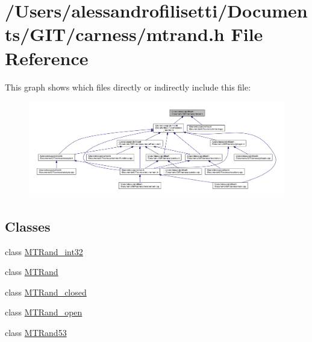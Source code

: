\hypertarget{a00091}{\section{/\-Users/alessandrofilisetti/\-Documents/\-G\-I\-T/carness/mtrand.h File Reference}
\label{a00091}
}
This graph shows which files directly or indirectly include this file\-:\nopagebreak
\begin{figure}[H]
\begin{center}
\leavevmode
\includegraphics[width=350pt]{a00140}
\end{center}
\end{figure}
\subsection*{Classes}
\begin{DoxyCompactItemize}
\item 
class \hyperlink{a00019}{M\-T\-Rand\-\_\-int32}
\item 
class \hyperlink{a00016}{M\-T\-Rand}
\item 
class \hyperlink{a00018}{M\-T\-Rand\-\_\-closed}
\item 
class \hyperlink{a00020}{M\-T\-Rand\-\_\-open}
\item 
class \hyperlink{a00017}{M\-T\-Rand53}
\end{DoxyCompactItemize}

